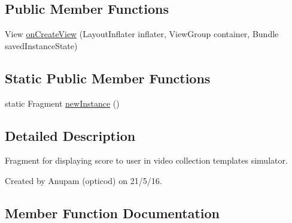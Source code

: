 \subsection*{Public Member Functions}
\begin{DoxyCompactItemize}
\item 
View \hyperlink{classorg_1_1buildmlearn_1_1toolkit_1_1videocollectiontemplate_1_1fragment_1_1LastFragment_ab6219e5b182a44e2fbbe32929d98f0c7}{on\+Create\+View} (Layout\+Inflater inflater, View\+Group container, Bundle saved\+Instance\+State)
\end{DoxyCompactItemize}
\subsection*{Static Public Member Functions}
\begin{DoxyCompactItemize}
\item 
static Fragment \hyperlink{classorg_1_1buildmlearn_1_1toolkit_1_1videocollectiontemplate_1_1fragment_1_1LastFragment_ae24e301ec8a7734abeddce2419cc9984}{new\+Instance} ()
\end{DoxyCompactItemize}


\subsection{Detailed Description}
Fragment for displaying score to user in video collection template\textquotesingle{}s simulator. 

Created by Anupam (opticod) on 21/5/16. 

\subsection{Member Function Documentation}
